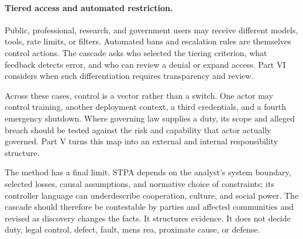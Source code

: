 \paragraph{Tiered access and automated restriction.}
Public, professional, research, and government users may receive different models, tools, rate limits, or filters. Automated bans and escalation rules are themselves control actions. The cascade asks who selected the tiering criterion, what feedback detects error, and who can review a denial or expand access. Part VI considers when such differentiation requires transparency and review.

Across these cases, control is a vector rather than a switch. One actor may control training, another deployment context, a third credentials, and a fourth emergency shutdown. Where governing law supplies a duty, its scope and alleged breach should be tested against the risk and capability that actor actually governed. Part V turns this map into an external and internal responsibility structure.

The method has a final limit. STPA depends on the analyst's system boundary, selected losses, causal assumptions, and normative choice of constraints; its controller language can underdescribe cooperation, culture, and social power. The cascade should therefore be contestable by parties and affected communities and revised as discovery changes the facts. It structures evidence. It does not decide duty, legal control, defect, fault, mens rea, proximate cause, or defense.
